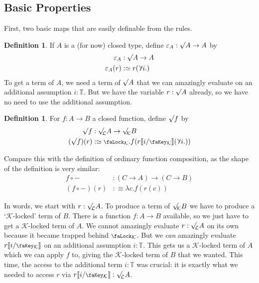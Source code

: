 \documentclass[10pt]{article}
\theoremstyle{definition}
\newtheorem{definition}[theorem]{Definition}
\let\oldequiv\equiv%
\renewcommand{\equiv}{\simeq}
\newcommand{\defeq}{\oldequiv}
\newcommand{\lock}{\mathchoice {\scalebox{0.8}{\text{\faLock}}}
  {\scalebox{0.8}{\text{\faLock}}} {\scalebox{0.5}{\text{\faLock}}}
  {\scalebox{0.4}{\text{\faLock}}} }
\newcommand{\key}{\mathchoice
  {\scalebox{0.8}{\text{\faKey}}} {\scalebox{0.8}{\text{\faKey}}}
  {\scalebox{0.5}{\text{\faKey}}} {\scalebox{0.4}{\text{\faKey}}} }
\newcommand{\rbindsym}{\raisebox{-0.5pt}{\scalerel*{\reflectbox{\rotatebox[origin=c]{185}{$\lambda$}}}{\lambda}}}
\newcommand{\rbind}[1]{\rbindsym{} #1.}
\newcommand{\Tiny}{\mathbb{T}}
\newcommand{\lockn}[1]{\mathcal{#1}}
\newcommand{\ctxlocke}[1]{\lock_{#1}}
\newcommand{\ctxlock}[1]{\ctxlocke{\lockn{#1}}}
\newcommand{\stubra}[1]{\llbracket #1 \rrbracket}
\newcommand{\substucke}[2]{\stubra{#1/\key_{#2}}}
\newcommand{\substuck}[2]{\substucke{#1}{\lockn{#2}}}
\newcommand{\rforme}[2]{\ThisStyle{\raisebox{0.07em}{$\SavedStyle \surd_{\hspace{-0.25em}#1}$}} #2}
\newcommand{\rform}[2]{\rforme{\lockn{#1}}{#2}}
\newcommand{\rformu}[1]{\ThisStyle{\raisebox{0.07em}{$\SavedStyle \surd$}} #1}
\newcommand{\rintroe}[2]{\lock_{#1}. #2}
\newcommand{\rintro}[2]{\rintroe{\lockn{#1}}{#2}}
\newcommand{\relim}[1]{\rbindsym #1}
\begin{document}
\subsection{Basic Properties}

First, two basic maps that are easily definable from the rules.

\begin{definition}
  If $A$ is a (for now) closed type, define
  $\varepsilon_A : \rformu{A} \to A$ by
  \begin{align*}
    \varepsilon_A &: \rformu{A} \to A \\
    \varepsilon_A(r) &:\defeq r(\rbind{i})
  \end{align*}
  To get a term of $A$, we need a term of $\rformu{A}$ that we can
  amazingly evaluate on an additional assumption $i : \Tiny$. But we
  have the variable $r : \rformu{A}$ already, so we have no need to
  use the additional assumption.
\end{definition}

\begin{definition}
  For $f : A \to B$ a closed function, define $\rformu f$ by
  \begin{align*}
    \rformu f &: \rform{L} A \to \rform{K} B \\
    (\rformu f)(r) &:\defeq \rintro{K}{f(r\substuck{i}{K}(\rbind{i}))}
  \end{align*}
\end{definition}

Compare this with the definition of ordinary function composition, as
the shape of the definition is very similar:
\begin{align*}
  f \circ - &: (C \to A) \to (C \to B) \\
  (f \circ -)(r) &:\defeq \lambda c. f(r(c))
\end{align*}

In words, we start with $r : \rform{L} A$. To produce a term of
$\rform{K} B$ we have to produce a `$\lockn{K}$-locked' term of
$B$. There is a function $f : A \to B$ available, so we just have to
get a $\lockn{K}$-locked term of $A$. We cannot amazingly evaluate
$r : \rform{L} A$ on its own because it became trapped behind
$\ctxlock{K}$. But we \emph{can} amazingly evaluate $r\substuck{i}{K}$
on an additional assumption $i : \Tiny$. This gets us a
$\lockn{K}$-locked term of $A$ which we can apply $f$ to, giving the
$\lockn{K}$-locked term of $B$ that we wanted. This time, the access
to the additional term $i : \Tiny$ was crucial: it is exactly what we
needed to access $r$ via $r\substuck{i}{K} : \rform{L}{A}$.
\end{document}
